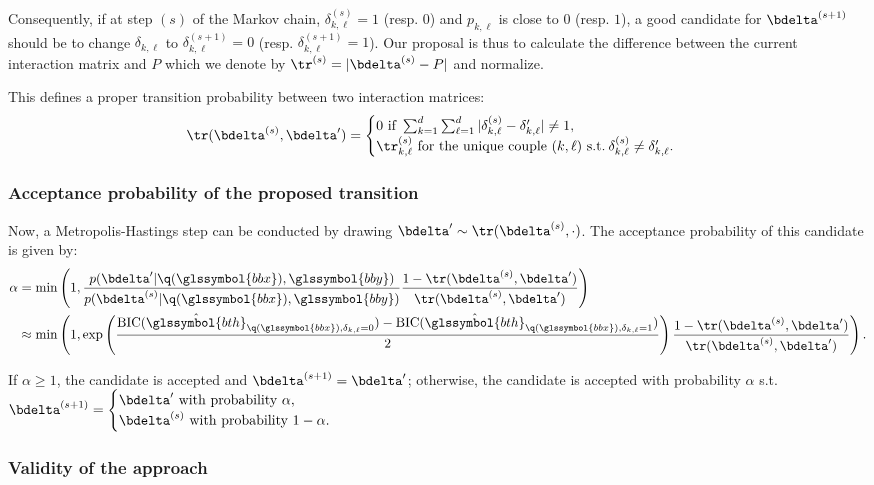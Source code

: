Consequently, if at step $(s)$ of the Markov chain, $\delta_{k,\ell}^{(s)} = 1$ (resp. $0$) and $p_{k,\ell}$ is close to $0$ (resp. $1$), a good candidate for $\bdelta^{(s+1)}$ should be to change $\delta_{k,\ell}$ to $\delta_{k,\ell}^{(s+1)} = 0$ (resp. $\delta_{k,\ell}^{(s+1)} = 1$). Our proposal is thus to calculate the difference between the current interaction matrix and $P$ which we denote by $\tr^{(s)} = |\bdelta^{(s)} - P|$ and normalize.

This defines a proper transition probability between two interaction matrices:
\[ \tr(\bdelta^{(s)},\bdelta') = \begin{cases} 0 \text{ if } \sum_{k=1}^d \sum_{\ell=1}^d |\delta^{(s)}_{k,\ell} - \delta_{k,\ell}'| \neq 1, \\ \tr^{(s)}_{k,\ell} \text{ for the unique couple } (k,\ell) \text{ s.t.} \: \delta^{(s)}_{k,\ell} \neq \delta_{k,\ell}'. \end{cases} \]

\subsubsection{Acceptance probability of the proposed transition}


Now, a Metropolis-Hastings step can be conducted by drawing $\bdelta' \sim \tr(\bdelta^{(s)},\cdot)$. The acceptance probability of this candidate is given by:
\begin{align*}
\alpha & = \min \left( 1, \frac{p(\bdelta' | \q(\glssymbol{bbx}), \glssymbol{bby})}{p(\bdelta^{(s)} | \q(\glssymbol{bbx}), \glssymbol{bby})} \frac{1-\tr(\bdelta^{(s)},\bdelta')}{\tr(\bdelta^{(s)},\bdelta')} \right) \\
& \approx \min \left( 1, \exp \left( \frac{\text{BIC}(\hat{\glssymbol{bth}}_{\q(\glssymbol{bbx}),\delta_{k,\ell}=0}) - \text{BIC}(\hat{\glssymbol{bth}}_{\q(\glssymbol{bbx}),\delta_{k,\ell}=1})}{2} \right) \frac{1-\tr(\bdelta^{(s)},\bdelta')}{\tr(\bdelta^{(s)},\bdelta')} \right).
\end{align*}

If $\alpha \geq 1$, the candidate is accepted and $\bdelta^{(s+1)} = \bdelta'$; otherwise, the candidate is accepted with probability $\alpha$ s.t.\ $\bdelta^{(s+1)} = \begin{cases} \bdelta' \text{ with probability } \alpha, \\ \bdelta^{(s)} \text{ with probability } 1-\alpha. \end{cases}$

\subsubsection{Validity of the approach}


